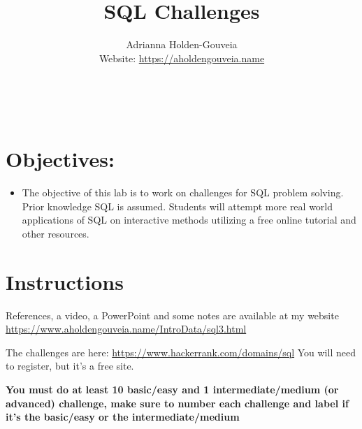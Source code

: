 \documentclass[12pt]{article}
\title{SQL Challenges}
\author{
        Adrianna Holden-Gouveia \\
        Website: \url{https://aholdengouveia.name}\\ 
        \date{\vspace{-5ex}}
        \faLinkedin{: aholdengouveia} \\
        \faGithub {: aholdengouveia} \\
        }
\begin{document}
    

\maketitle


\section*{Objectives:}
\begin{itemize}
    \item The objective of this lab is to work on challenges for SQL problem solving. Prior knowledge SQL is assumed. Students will attempt more real world applications of SQL on interactive methods utilizing a free online tutorial and other resources.
\end{itemize}
\section*{Instructions}

References, a video, a PowerPoint and some notes are available at my website
\url {https://www.aholdengouveia.name/IntroData/sql3.html}

The challenges are here: \url{https://www.hackerrank.com/domains/sql} You will need to register, but it's a free site. 


\textbf{You must do at least 10 basic/easy and 1 intermediate/medium (or advanced) challenge, make sure to number each challenge and label if it's the basic/easy or the intermediate/medium}
\end{document}
